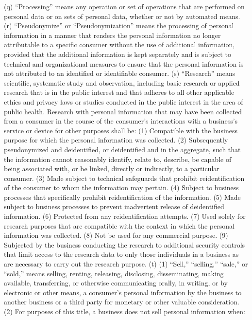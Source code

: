 (q) “Processing” means any operation or set of operations that are performed on personal data or on sets of personal data, whether or not by automated means.
(r) “Pseudonymize” or “Pseudonymization” means the processing of personal information in a manner that renders the personal information no longer attributable to a specific consumer without the use of additional information, provided that the additional information is kept separately and is subject to technical and organizational measures to ensure that the personal information is not attributed to an identified or identifiable consumer.
(s) “Research” means scientific, systematic study and observation, including basic research or applied research that is in the public interest and that adheres to all other applicable ethics and privacy laws or studies conducted in the public interest in the area of public health. Research with personal information that may have been collected from a consumer in the course of the consumer’s interactions with a business’s service or device for other purposes shall be:
(1) Compatible with the business purpose for which the personal information was collected.
(2) Subsequently pseudonymized and deidentified, or deidentified and in the aggregate, such that the information cannot reasonably identify, relate to, describe, be capable of being associated with, or be linked, directly or indirectly, to a particular consumer.
(3) Made subject to technical safeguards that prohibit reidentification of the consumer to whom the information may pertain.
(4) Subject to business processes that specifically prohibit reidentification of the information.
(5) Made subject to business processes to prevent inadvertent release of deidentified information.
(6) Protected from any reidentification attempts.
(7) Used solely for research purposes that are compatible with the context in which the personal information was collected.
(8) Not be used for any commercial purpose.
(9) Subjected by the business conducting the research to additional security controls that limit access to the research data to only those individuals in a business as are necessary to carry out the research purpose.
(t) (1) “Sell,” “selling,” “sale,” or “sold,” means selling, renting, releasing, disclosing, disseminating, making available, transferring, or otherwise communicating orally, in writing, or by electronic or other means, a consumer’s personal information by the business to another business or a third party for monetary or other valuable consideration.
(2) For purposes of this title, a business does not sell personal information when:
